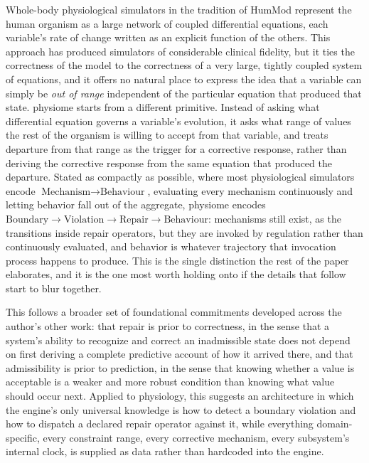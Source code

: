 \documentclass[11pt]{article}
\begin{document}
Whole-body physiological simulators in the tradition of HumMod represent the human organism as a large network of coupled differential equations, each variable's rate of change written as an explicit function of the others. This approach has produced simulators of considerable clinical fidelity, but it ties the correctness of the model to the correctness of a very large, tightly coupled system of equations, and it offers no natural place to express the idea that a variable can simply be \emph{out of range} independent of the particular equation that produced that state. physiome starts from a different primitive. Instead of asking what differential equation governs a variable's evolution, it asks what range of values the rest of the organism is willing to accept from that variable, and treats departure from that range as the trigger for a corrective response, rather than deriving the corrective response from the same equation that produced the departure. Stated as compactly as possible, where most physiological simulators encode $\text{Mechanism} \rightarrow \text{Behaviour}$, evaluating every mechanism continuously and letting behavior fall out of the aggregate, physiome encodes $\text{Boundary} \rightarrow \text{Violation} \rightarrow \text{Repair} \rightarrow \text{Behaviour}$: mechanisms still exist, as the transitions inside repair operators, but they are invoked by regulation rather than continuously evaluated, and behavior is whatever trajectory that invocation process happens to produce. This is the single distinction the rest of the paper elaborates, and it is the one most worth holding onto if the details that follow start to blur together.

This follows a broader set of foundational commitments developed across the author's other work: that repair is prior to correctness, in the sense that a system's ability to recognize and correct an inadmissible state does not depend on first deriving a complete predictive account of how it arrived there, and that admissibility is prior to prediction, in the sense that knowing whether a value is acceptable is a weaker and more robust condition than knowing what value should occur next. Applied to physiology, this suggests an architecture in which the engine's only universal knowledge is how to detect a boundary violation and how to dispatch a declared repair operator against it, while everything domain-specific, every constraint range, every corrective mechanism, every subsystem's internal clock, is supplied as data rather than hardcoded into the engine.
\end{document}
